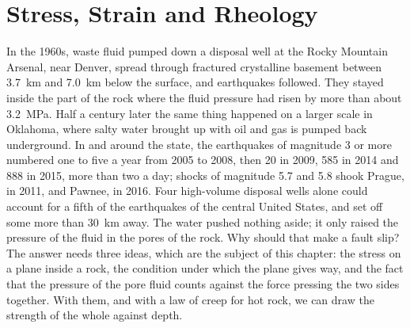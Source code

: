 \chapter{Stress, Strain and Rheology}\label{ch:b1:stress-strain-rheology}

In the 1960s, waste fluid pumped down a disposal well at the Rocky Mountain
Arsenal, near Denver, spread through fractured crystalline basement between
\qty{3.7}{km} and \qty{7.0}{km} below the surface, and earthquakes followed.
They stayed inside the part of the rock where the fluid pressure had risen by
more than about \qty{3.2}{MPa}.
Half a century later the same thing happened on a larger scale in Oklahoma,
where salty water brought up with oil and gas is pumped back underground. In
and around the state, the earthquakes of magnitude 3 or more numbered one to
five a year from 2005 to 2008, then \num{20} in 2009, \num{585} in 2014 and
\num{888} in 2015, more than two a day; shocks of magnitude 5.7 and 5.8 shook
Prague, in 2011, and Pawnee, in 2016. Four high-volume disposal wells alone
could account for a fifth of the earthquakes of the central United States, and
set off some more than \qty{30}{km} away.
The water pushed nothing aside; it only raised the pressure
of the fluid in the pores of the rock. Why should that make a fault slip?
The answer needs three ideas, which are the subject of this chapter: the
stress on a plane inside a rock, the condition under which the plane gives
way, and the fact that the pressure of the pore fluid counts against the
force pressing the two sides together. With them, and with a law of creep for
hot rock, we can draw the strength of the whole  against depth.

